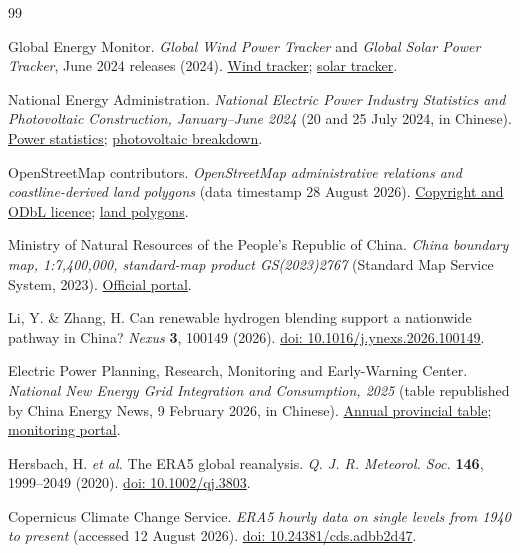 \documentclass[pdflatex,sn-nature]{sn-jnl}
\begin{document}
\begin{thebibliography}{99}

Global Energy Monitor. \emph{Global Wind Power Tracker} and \emph{Global Solar Power Tracker}, June 2024 releases (2024). \href{https://globalenergymonitor.org/projects/global-wind-power-tracker/}{Wind tracker}; \href{https://globalenergymonitor.org/projects/global-solar-power-tracker/}{solar tracker}.

National Energy Administration. \emph{National Electric Power Industry Statistics and Photovoltaic Construction, January--June 2024} (20 and 25 July 2024, in Chinese). \href{https://www.nea.gov.cn/2024-07/20/c_1310782235.htm}{Power statistics}; \href{https://www.nea.gov.cn/2024-07/25/c_1310782757.htm}{photovoltaic breakdown}.

OpenStreetMap contributors. \emph{OpenStreetMap administrative relations and coastline-derived land polygons} (data timestamp 28 August 2026). \href{https://www.openstreetmap.org/copyright}{Copyright and ODbL licence}; \href{https://osmdata.openstreetmap.de/data/land-polygons.html}{land polygons}.

Ministry of Natural Resources of the People's Republic of China. \emph{China boundary map, 1:7,400,000, standard-map product GS(2023)2767} (Standard Map Service System, 2023). \href{http://bzdt.ch.mnr.gov.cn/}{Official portal}.

Li, Y. \& Zhang, H. Can renewable hydrogen blending support a nationwide pathway in China? \emph{Nexus} \textbf{3}, 100149 (2026). \href{https://doi.org/10.1016/j.ynexs.2026.100149}{doi: 10.1016/j.ynexs.2026.100149}.

Electric Power Planning, Research, Monitoring and Early-Warning Center. \emph{National New Energy Grid Integration and Consumption, 2025} (table republished by China Energy News, 9 February 2026, in Chinese). \href{https://epaper.ceic.com/pad/content/202602/09/content_20205.html}{Annual provincial table}; \href{https://www.xnyxnyj.cn/}{monitoring portal}.

Hersbach, H. \emph{et al.} The ERA5 global reanalysis. \emph{Q. J. R. Meteorol. Soc.} \textbf{146}, 1999--2049 (2020). \href{https://doi.org/10.1002/qj.3803}{doi: 10.1002/qj.3803}.

Copernicus Climate Change Service. \emph{ERA5 hourly data on single levels from 1940 to present} (accessed 12 August 2026). \href{https://doi.org/10.24381/cds.adbb2d47}{doi: 10.24381/cds.adbb2d47}.


\end{thebibliography}
\end{document}
